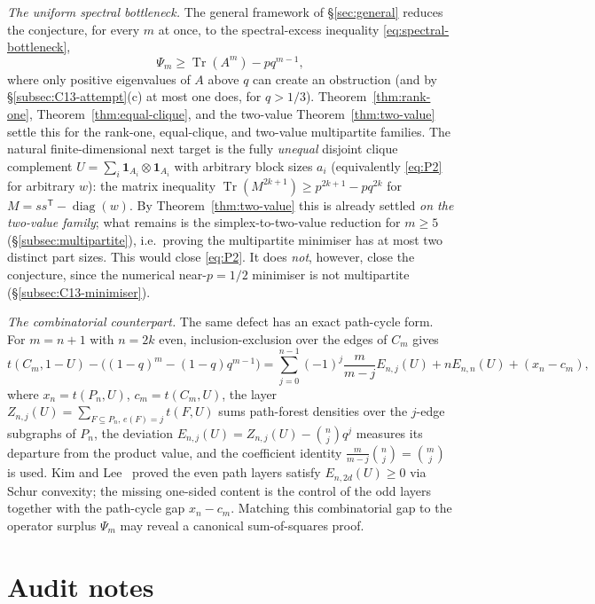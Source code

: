\documentclass[11pt]{article}
\newcommand{\Tr}{\operatorname{Tr}}
\begin{document}
\medskip\noindent\emph{The uniform spectral bottleneck.}
The general framework of \S\ref{sec:general} reduces the conjecture, for every $m$ at once, to the spectral-excess inequality \eqref{eq:spectral-bottleneck},
\[
        \Psi_m\ge\Tr(A^m)-pq^{m-1},
\]
where only positive eigenvalues of $A$ above $q$ can create an obstruction (and by \S\ref{subsec:C13-attempt}\textup{(c)} at most one does, for $q>1/3$).  Theorem~\ref{thm:rank-one}, Theorem~\ref{thm:equal-clique}, and the two-value Theorem~\ref{thm:two-value} settle this for the rank-one, equal-clique, and two-value multipartite families.  The natural finite-dimensional next target is the fully \emph{unequal} disjoint clique complement $U=\sum_i\mathbf 1_{A_i}\otimes\mathbf 1_{A_i}$ with arbitrary block sizes $a_i$ (equivalently \eqref{eq:P2} for arbitrary $w$): the matrix inequality $\Tr(M^{2k+1})\ge p^{2k+1}-pq^{2k}$ for $M=ss^{\mathsf T}-\operatorname{diag}(w)$.  By Theorem~\ref{thm:two-value} this is already settled \emph{on the two-value family}; what remains is the simplex-to-two-value reduction for $m\ge5$ (\S\ref{subsec:multipartite}), i.e.\ proving the multipartite minimiser has at most two distinct part sizes.  This would close \eqref{eq:P2}.  It does \emph{not}, however, close the conjecture, since the numerical near-$p=1/2$ minimiser is not multipartite (\S\ref{subsec:C13-minimiser}).

\medskip\noindent\emph{The combinatorial counterpart.}
The same defect has an exact path-cycle form.  For $m=n+1$ with $n=2k$ even, inclusion-exclusion over the edges of $C_m$ gives
\[
        t(C_m,1-U)-\bigl((1-q)^m-(1-q)q^{m-1}\bigr)
        =\sum_{j=0}^{n-1}(-1)^j\frac{m}{m-j}E_{n,j}(U)+nE_{n,n}(U)+(x_n-c_m),
\]
where $x_n=t(P_n,U)$, $c_m=t(C_m,U)$, the layer $Z_{n,j}(U)=\sum_{F\subseteq P_n,\,e(F)=j}t(F,U)$ sums path-forest densities over the $j$-edge subgraphs of $P_n$, the deviation $E_{n,j}(U)=Z_{n,j}(U)-\binom nj q^j$ measures its departure from the product value, and the coefficient identity $\frac{m}{m-j}\binom nj=\binom mj$ is used.  Kim and Lee~\cite{KimLee2022} proved the even path layers satisfy $E_{n,2d}(U)\ge0$ via Schur convexity; the missing one-sided content is the control of the odd layers together with the path-cycle gap $x_n-c_m$.  Matching this combinatorial gap to the operator surplus $\Psi_m$ may reveal a canonical sum-of-squares proof.

\section{Audit notes}
\end{document}
